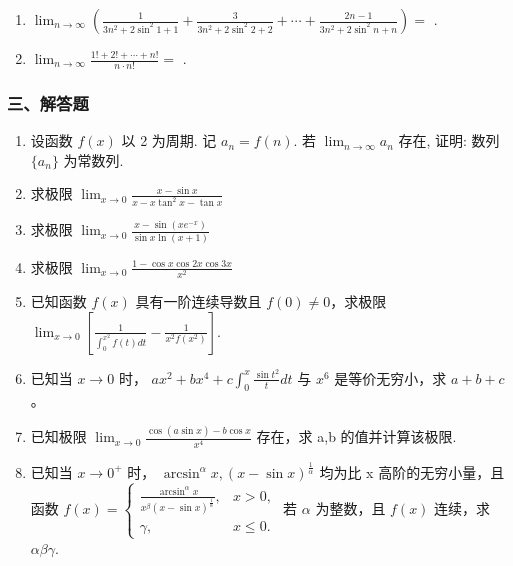 \documentclass[12pt, a4paper]{ctexart}
\begin{document}
\begin{enumerate}[start=29]
    \item $ \lim_{n\to\infty}\left(\frac{1}{3n^{2}+2\sin^{2}1+1}+\frac{3}{3n^{2}+2\sin^{2}2+2}+\cdots+\frac{2n-1}{3n^{2}+2\sin^{2}n+n}\right)= $ \underline{\hspace{2cm}}.
    
    \item $ \lim_{n\to\infty}\frac{1!+2!+\cdots+n!}{n\cdot n!}= $ \underline{\hspace{2cm}}.
\end{enumerate}

\subsubsection*{三、解答题}

\begin{enumerate}[start=52]
    \item 设函数 $ f(x) $ 以 2 为周期. 记 $ a_n = f(n) $. 若 $ \lim_{n \to \infty} a_n $ 存在, 证明: 数列 $ \{a_n\} $ 为常数列.

    \item 求极限 $ \lim_{x\to0}\frac{x-\sin x}{x-x\tan^{2}x-\tan x} $

    \item 求极限 $ \lim_{x\to0}\frac{x-\sin\left(xe^{-x}\right)}{\sin x\ln\left(x+1\right)} $

    \item 求极限 $ \lim_{x\to0}\frac{1-\cos x\cos2x\cos3x}{x^{2}} $

    \item 已知函数 $ f(x) $ 具有一阶连续导数且 $ f(0) \neq 0 $，求极限 $ \lim_{x \to 0} \left[ \frac{1}{\int_{0}^{x^{2}} f(t) dt} - \frac{1}{x^{2} f\left(x^{2}\right)} \right] $.

    \item 已知当 $ x \to 0 $ 时， $ ax^{2} + bx^{4} + c \int_{0}^{x} \frac{\sin t^{2}}{t} dt $ 与 $ x^{6} $ 是等价无穷小，求 $ a + b + c $。

    \item 已知极限 $ \lim_{x\to0}\frac{\cos(a\sin x)-b\cos x}{x^{4}} $ 存在，求 a,b 的值并计算该极限.

    \item 已知当 $ x \to 0^{+} $ 时， $ \arcsin^{\alpha}x, (x - \sin x)^{\frac{1}{\alpha}} $ 均为比 x 高阶的无穷小量，且函数 $ f(x) = \begin{cases} \frac{\arcsin^{\alpha}x}{x^{\beta}(x - \sin x)^{\frac{1}{\alpha}}}, & x > 0, \\ \gamma, & x \leq 0. \end{cases} $ 若 $ \alpha $ 为整数，且 $ f(x) $ 连续，求 $ \alpha\beta\gamma $.


\end{enumerate}
\end{document}
